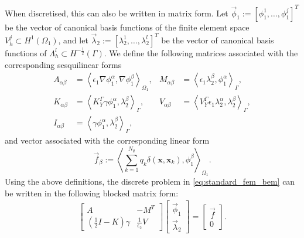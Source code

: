 When discretised, this can also be written in matrix form. Let $\vec{\phi}_1 := [\phi_1^1, \dots, \phi_1^j]^T$ be the vector of canonical basis
functions of the finite element space $V_{h}^{j}\subset H^1(\Omega_1)$, %
and let $\vec{\lambda}_2 := [\lambda_2^1, \dots, \lambda_2^l]^T$ be the vector of canonical basis
functions of $\Lambda_{h}^{l}\subset H^{-\frac{1}{2}}(\Gamma)$. %
We define the following matrices associated with the corresponding sesquilinear forms
\begin{align*}
A_{\alpha \beta} &= \left\langle\epsilon_1\nabla\phi_1^{\alpha}, \nabla \phi_1^{\beta} \right\rangle_{\Omega_1},&
M_{\alpha \beta} &= \left\langle \epsilon_1\lambda^{\beta}_2,\phi_1^{\alpha}\right\rangle_{\Gamma},\\
K_{\alpha \beta} &= \left\langle K_{Y}^{\Gamma} \gamma \phi^{\alpha}_1, \lambda^{\beta}_2 \right\rangle_{\Gamma},&
V_{\alpha \beta} &= \left\langle V_{Y}^{\Gamma} \epsilon_1\lambda^{\alpha}_2, \lambda^{\beta}_2 \right\rangle_{\Gamma},\\
I_{\alpha \beta} &= \left\langle \gamma \phi^{\alpha}_1, \lambda^{\beta}_2 \right\rangle_{\Gamma},
\end{align*}
and vector associated with the corresponding linear form
\begin{equation*}
\vec{f}_{\beta} := \left\langle  \sum_{k=1}^{N_q} q_k\delta(\mathbf{x},\mathbf{x}_k),  \phi_1^{\beta} \right\rangle_{\Omega_1}.
\end{equation*}
Using the above definitions, the discrete problem in \eqref{eq:standard_fem_bem} can be written in the following blocked matrix form:
\begin{align}\label{eq:fembem_matrix}
\begin{bmatrix}
A & -M^T \\  
\left(\tfrac12 I - K \right) \gamma &  \tfrac{1}{\epsilon_2} V 
\end{bmatrix}
\begin{bmatrix}
\vec{\phi}_1 \\  
\vec{\lambda}_2
\end{bmatrix}
= 
\begin{bmatrix}
\vec{f} \\  
0
\end{bmatrix}.
\end{align}

